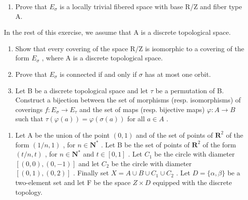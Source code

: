 \begin{enumerate}
\def\labelenumi{\alph{enumi})}
\tightlist
\item
  Prove that \(E_{\sigma}\) is a locally trivial fibered space with base R/Z and fiber type A.
\end{enumerate}

In the rest of this exercise, we assume that A is a discrete topological space.

\begin{enumerate}
\def\labelenumi{\alph{enumi})}
\setcounter{enumi}{1}
\item
  Show that every covering of the space R/Z is isomorphic to a covering of the form \(E_{\sigma}\) , where A is a discrete topological space.
\item
  Prove that \(E_{\sigma}\) is connected if and only if \(\sigma\) has at most one orbit.
\item
  Let B be a discrete topological space and let \(\tau\) be a permutation of B. Construct a bijection between the set of morphisms (resp. isomorphisms) of coverings \(f: E_{\sigma} \to E_{\tau}\) and the set of maps (resp. bijective maps) \(\varphi: A \to B\) such that \(\tau(\varphi(a)) = \varphi(\sigma(a))\) for all \(a \in A\) .
\end{enumerate}

\begin{enumerate}
\def\labelenumi{\arabic{enumi})}
\setcounter{enumi}{3}
\tightlist
\item
  Let A be the union of the point \((0,1)\) and of the set of points of \(\mathbf{R}^{2}\) of the form \((1/n,1)\) , for \(n \in \mathbf{N}^{*}\) . Let B be the set of points of \(\mathbf{R}^{2}\) of the form \((t/n,t)\) , for \(n \in \mathbf{N}^{*}\) and \(t \in [0,1]\) . Let \(C_{1}\) be the circle with diameter \([(0,0),(0,-1)]\) and let \(C_{2}\) be the circle with diameter \([(0,1),(0,2)]\) . Finally set \(X = A \cup B \cup C_{1} \cup C_{2}\) . Let \(D = \{\alpha, \beta\}\) be a two-element set and let F be the space \(Z \times D\) equipped with the discrete topology.
\end{enumerate}

